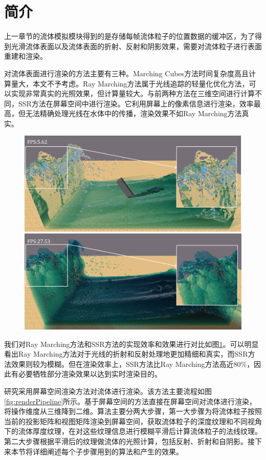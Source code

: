 \section{简介}

上一章节的流体模拟模块得到的是存储每帧流体粒子的位置数据的缓冲区，为了得到光滑流体表面以及流体表面的折射、反射和阴影效果，需要对流体粒子进行表面重建和渲染。

对流体表面进行渲染的方法主要有三种。Marching Cubes方法时间复杂度高且计算量大，本文不予考虑。Ray Marching方法属于光线追踪的轻量化优化方法，可以实现非常真实的光照效果，但计算量较大。与前两种方法在三维空间进行计算不同，SSR方法在屏幕空间中进行渲染。它利用屏幕上的像素信息进行渲染，效率最高，但无法精确处理光线在水体中的传播，渲染效果不如Ray Marching方法真实。

\begin{figure}[H]
    \centering
    \includegraphics[width=0.9\linewidth]{image/render1.png}
    \label{fig:render1}
\end{figure}


我们对Ray Marching方法和SSR方法的实现效率和效果进行对比如图\ref{fig:render1}。可以明显看出Ray Marching方法对于光线的折射和反射处理地更加精细和真实，而SSR方法效果则较为模糊。但在渲染效率上，SSR方法比Ray Marching方法高近$80\%$，因此有必要牺牲部分渲染效果以达到实时渲染目的。


研究采用屏幕空间渲染方法对流体进行渲染。该方法主要流程如图\ref{fig:renderPipeline}所示。基于屏幕空间的方法直接在屏幕空间对流体进行渲染，将操作维度从三维降到二维。算法主要分两大步骤，第一大步骤为将流体粒子按照当前的投影矩阵和视图矩阵渲染到屏幕空间，获取流体粒子的深度纹理和不同视角下的流体厚度纹理，在对这些纹理信息进行模糊平滑后计算流体粒子的法线纹理。第二大步骤根据平滑后的纹理做流体的光照计算，包括反射、折射和自阴影。接下来本节将详细阐述每个子步骤用到的算法和产生的效果。


